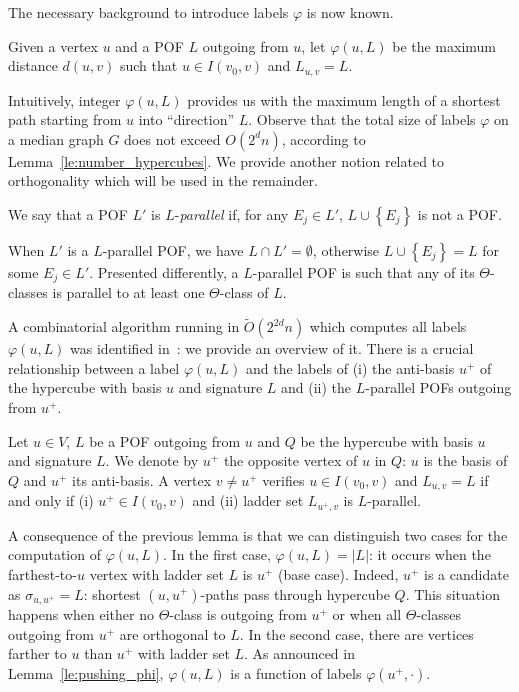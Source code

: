 \documentclass[a4paper,UKenglish,numberwithinsect,cleveref, autoref]{lipics-v2021}
\newcommand{\set}[1]{\left\{ #1 \right\}}
\newcommand{\card}[1]{\left| #1 \right|}
\begin{document}
The necessary background to introduce labels $\varphi$ is now known.

\begin{definition}
Given a vertex $u$ and a POF $L$ outgoing from $u$, let $\varphi(u,L)$ be the maximum distance $d(u,v)$ such that $u \in I(v_0,v)$ and $L_{u,v} = L$.
\label{def:varphi}
\end{definition}

Intuitively, integer $\varphi(u,L)$ provides us with the maximum length of a shortest path starting from $u$ into ``direction'' $L$. Observe that the total size of labels $\varphi$ on a median graph $G$ does not exceed $O(2^dn)$, according to Lemma~\ref{le:number_hypercubes}. We provide another notion related to orthogonality which will be used in the remainder.

\begin{definition}[$L$-parallelism]
We say that a POF $L'$ is $L$-\emph{parallel} if, for any $E_j \in L'$, $L \cup \set{E_j}$ is not a POF.
\label{def:pof_parallel}
\end{definition}

When $L'$ is a $L$-parallel POF, we have $L \cap L' = \emptyset$, otherwise $L \cup \set{E_j} = L$ for some $E_j \in L'$. Presented differently, a $L$-parallel POF is such that any of its $\Theta$-classes is parallel to at least one $\Theta$-class of $L$.

A combinatorial algorithm running in $\tilde{O}(2^{2d}n)$ which computes all labels $\varphi(u,L)$ was identified in~\cite{BeHa21}: we provide an overview of it. There is a crucial relationship between a label $\varphi(u,L)$ and the labels of (i) the anti-basis $u^+$ of the hypercube with basis $u$ and signature $L$ and (ii) the $L$-parallel POFs outgoing from $u^+$.

\begin{lemma}
Let $u \in V$, $L$ be a POF outgoing from $u$ and $Q$ be the hypercube with basis $u$ and signature $L$. We denote by $u^+$ the opposite vertex of $u$ in $Q$: $u$ is the basis of $Q$ and $u^+$ its anti-basis. A vertex $v\neq u^+$ verifies $u \in I(v_0,v)$ and $L_{u,v} = L$ if and only if (i) $u^+ \in I(v_0,v)$ and (ii) ladder set $L_{u^+,v}$ is $L$-parallel.
\label{le:pushing_phi}
\end{lemma}

A consequence of the previous lemma is that we can distinguish two cases for the computation of $\varphi(u,L)$. In the first case, $\varphi(u,L) = \card{L}$: it occurs when the farthest-to-$u$ vertex with ladder set $L$ is $u^+$ (base case). Indeed, $u^+$ is a candidate as $\sigma_{u,u^+} = L$: shortest $(u,u^+)$-paths pass through hypercube $Q$. This situation happens when either no $\Theta$-class is outgoing from $u^+$ or when all $\Theta$-classes outgoing from $u^+$ are orthogonal to $L$. In the second case, there are vertices farther to $u$ than $u^+$ with ladder set $L$. As announced in Lemma~\ref{le:pushing_phi}, $\varphi(u,L)$ is a function of labels $\varphi(u^+,\cdot)$.
\end{document}
